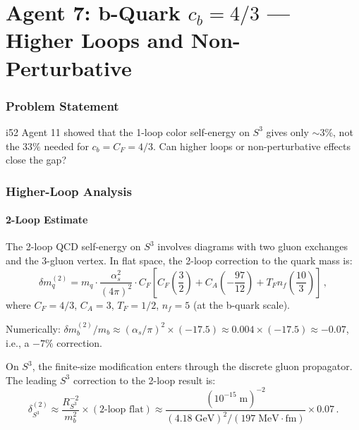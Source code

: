 \documentclass[11pt,a4paper]{article}
\begin{document}
\part{Agent 7: b-Quark $c_b = 4/3$ --- Higher Loops and Non-Perturbative}
\label{part:bquark}

\section{Problem Statement}

i52 Agent 11 showed that the 1-loop color self-energy on $S^3$ gives only $\sim 3\%$, not the $33\%$ needed for $c_b = C_F = 4/3$. Can higher loops or non-perturbative effects close the gap?

\section{Higher-Loop Analysis}

\subsection{2-Loop Estimate}

The 2-loop QCD self-energy on $S^3$ involves diagrams with two gluon exchanges and the 3-gluon vertex. In flat space, the 2-loop correction to the quark mass is:
\begin{equation}
\delta m_q^{(2)} = m_q \cdot \frac{\alpha_s^2}{(4\pi)^2} \cdot C_F \left[C_F\left(\frac{3}{2}\right) + C_A\left(-\frac{97}{12}\right) + T_F n_f\left(\frac{10}{3}\right)\right]\,,
\end{equation}
where $C_F = 4/3$, $C_A = 3$, $T_F = 1/2$, $n_f = 5$ (at the b-quark scale).

Numerically: $\delta m_b^{(2)}/m_b \approx (\alpha_s/\pi)^2 \times (-17.5) \approx 0.004 \times (-17.5) \approx -0.07$, i.e., a $-7\%$ correction.

On $S^3$, the finite-size modification enters through the discrete gluon propagator. The leading $S^3$ correction to the 2-loop result is:
\begin{equation}
\delta_{S^3}^{(2)} \approx \frac{R_{S^3}^{-2}}{m_b^2} \times (\text{2-loop flat}) \approx \frac{(10^{-15}\;\mathrm{m})^{-2}}{(4.18\;\mathrm{GeV})^2/(197\;\mathrm{MeV\cdot fm})} \times 0.07\,.
\end{equation}
\end{document}
